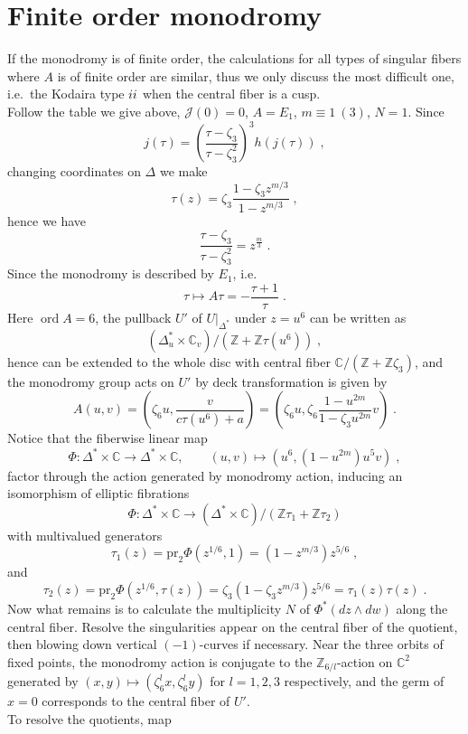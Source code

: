 \section{Finite order monodromy}
If the monodromy is of finite order, the calculations for all types of singular fibers where $A$ is of finite order are similar, thus we only discuss the most difficult one, i.e.\ the Kodaira type $\uppercase\expandafter{\romannumeral2}$ when the central fiber is a cusp.\\ \indent
Follow the table we give above, $\mathscr{J}(0)=0$, $A=E_1$, $m\equiv1~(3)$, $N=1$. Since
$$j(\tau)=\left(\frac{\tau-\zeta_3}{\tau-\zeta_3^2}\right)^3h(j(\tau))\; ,$$
changing coordinates on $\Delta$ we make 
$$\tau(z)=\zeta_3\frac{1-\zeta_3z^{m/3}}{1-z^{m/3}}\; ,$$
hence we have
$$\frac{\tau-\zeta_3}{\tau-\zeta_3^2}=z^{\frac{m}{3}}\; .$$
\indent Since the monodromy is  described by $E_1$, i.e.
$$\tau\mapsto A\tau=-\frac{\tau+1}{\tau}\; .$$
\indent Here $\operatorname{ord}A=6$, the pullback $U'$ of $U|_{\Delta^*}$ under $z=u^6$ can be written as
$$(\Delta_u^*\times\mathbb{C}_v)/(\mathbb{Z}+\mathbb{Z}\tau(u^6))\; ,$$
hence can be extended to the whole disc with central fiber $\mathbb{C}/(\mathbb{Z}+\mathbb{Z}\zeta_3)$, and the monodromy group acts on $U'$ by deck transformation is given by
$$A(u,v)=\left(\zeta_6u,\frac{v}{c\tau(u^6)+a}\right)=\left(\zeta_6u,\zeta_6\frac{1-u^{2m}}{1-\zeta_3u^{2m}}v\right)\; .$$
\indent Notice that the fiberwise linear map
$$\Phi\colon\Delta^*\times \mathbb{C}\rightarrow \Delta^*\times\mathbb{C},\qquad (u,v)\mapsto (u^6,(1-u^{2m})u^5v)\; ,$$
factor through the action generated by monodromy action, inducing an isomorphism of elliptic fibrations
$$\Phi\colon\Delta^*\times \mathbb{C}\rightarrow (\Delta^*\times\mathbb{C})/(\mathbb{Z}\tau_1+\mathbb{Z}\tau_2)$$
with multivalued generators
$$\tau_1(z)=\textrm{pr}_2\Phi(z^{1/6},1)=(1-z^{m/3})z^{5/6}\; ,$$
and
$$\tau_2(z)=\textrm{pr}_2 \Phi(z^{1/6},\tau(z))=\zeta_3(1-\zeta_3z^{m/3})z^{5/6}=\tau_1(z)\tau(z)\; .$$
\indent Now what remains is to calculate the multiplicity $N$ of $\Phi^*(dz\wedge dw)$ along the central fiber. Resolve the singularities appear on the central fiber of the quotient, then blowing down vertical $(-1)$-curves if necessary. Near the three orbits of fixed points, the monodromy action is conjugate to the $\mathbb{Z}_{6/l}$-action on $\mathbb{C}^2$ generated by $(x,y)\mapsto(\zeta_6^lx,\zeta_6^ly)$ for $l=1,2,3$ respectively, and the germ of $x=0$ corresponds to the central fiber of $U'$.\\ \indent
To resolve the quotients, map
